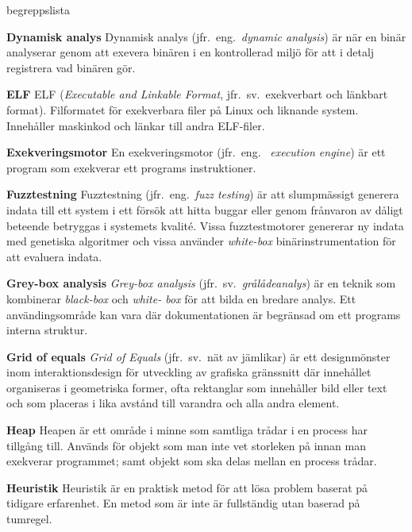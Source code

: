 \begin{labeling}{begreppslista}
    \item [\textbf{Dynamisk analys}] Dynamisk analys (jfr.\ eng.\ \emph{dynamic
        analysis}) är när en binär analyserar genom att exevera binären i en
    kontrollerad miljö för att i detalj registrera vad binären gör.

    \item [\textbf{ELF}] ELF (\emph{Executable and Linkable Format}, jfr.\ sv.\
    exekverbart och länkbart format). Filformatet för exekverbara filer
    på Linux och liknande system. Innehåller maskinkod och länkar till andra
    ELF-filer.

    \item [\textbf{Exekveringsmotor}] En exekveringsmotor (jfr.\ eng.
    \ \emph{execution engine}) är ett program som exekverar ett programs
    instruktioner.

    \item [\textbf{Fuzztestning}] Fuzztestning (jfr.\ eng.\ \emph{fuzz testing})
    är att slumpmässigt generera indata till ett system i ett försök att hitta
    buggar eller genom frånvaron av dåligt beteende betryggas i systemets
    kvalité. Vissa fuzztestmotorer genererar ny indata med genetiska algoritmer
    och vissa använder \emph{white-box} binärinstrumentation för att evaluera indata.

    \item [\textbf{Grey-box analysis}] \emph{Grey-box analysis} (jfr.\ sv.\
    \emph{grålådeanalys}) är en teknik som kombinerar \emph{black-box} och \emph{white-
    box} för att bilda en bredare analys. Ett användingsområde kan vara där
    dokumentationen är begränsad om ett programs interna struktur.

\item [\textbf{Grid of equals}] \emph{Grid of Equals} (jfr.\ sv.\ nät av
        jämlikar) är ett designmönster inom interaktionsdesign för utveckling av
    grafiska gränssnitt där innehållet organiseras i geometriska former, ofta
    rektanglar som innehåller bild eller text och som placeras i lika avstånd
    till varandra och alla andra element.

    \item [\textbf{Heap}] Heapen är ett område i minne som samtliga trådar i
    en process har tillgång till. Används för objekt som man inte vet storleken på
    innan man exekverar programmet; samt objekt som ska delas mellan en process
    trådar.

    \item [\textbf{Heuristik}] Heuristik är en praktisk metod för att lösa
    problem baserat på tidigare erfarenhet. En metod som är inte är fullständig
    utan baserad på tumregel.


\end{labeling}
